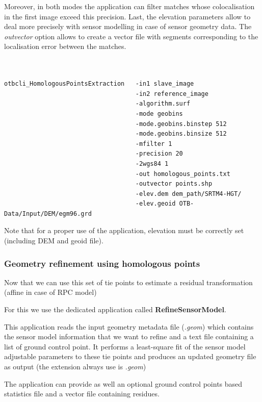 Moreover, in both modes the application can filter matches whose colocalisation in
the first image exceed this precision. Last, the elevation parameters allow to deal
more precisely with sensor modelling in case of sensor geometry data. The
\textit{outvector} option allows to create a vector file with segments
corresponding to the localisation error between the matches.
\begin{verbatim}


otbcli_HomologousPointsExtraction   -in1 slave_image
                                    -in2 reference_image
                                    -algorithm.surf
                                    -mode geobins
                                    -mode.geobins.binstep 512
                                    -mode.geobins.binsize 512
                                    -mfilter 1
                                    -precision 20
                                    -2wgs84 1
                                    -out homologous_points.txt
                                    -outvector points.shp
                                    -elev.dem dem_path/SRTM4-HGT/
                                    -elev.geoid OTB-Data/Input/DEM/egm96.grd

\end{verbatim}

Note that for a proper use of the application, elevation must be correctly set
(including DEM and geoid file).

\subsubsection{Geometry refinement using homologous points}

Now that we can use this set of tie points to estimate a residual transformation (affine in case of RPC model)

For this we use the dedicated application called \textbf{RefineSensorModel}.

This application reads the input geometry metadata file (\textit{.geom}) which contains the
sensor model information that we want to refine and a text file containing a
list of ground control point. It  performs a least-square fit of the sensor
model adjustable parameters to these tie points and produces an
updated geometry file as output (the extension always use is \textit{.geom})

The application can provide as well an optional ground control points based
statistics file and a vector file containing residues.

